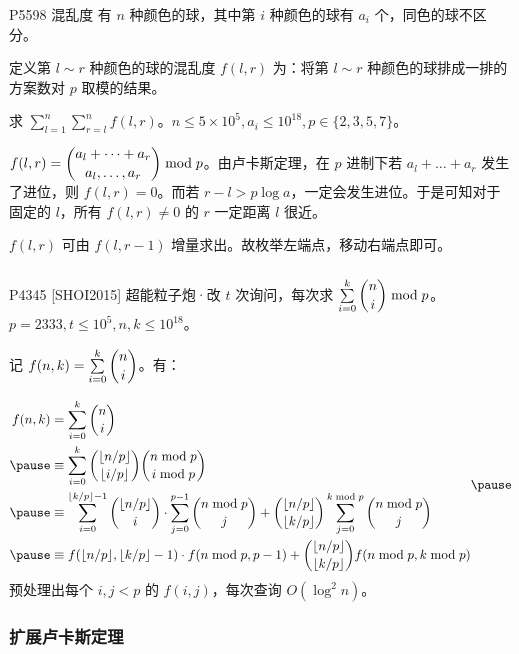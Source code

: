 \documentclass[../main.tex]{subfiles}
\begin{document}
\begin{frame}{P5598 混乱度}
有 $n$ 种颜色的球，其中第 $i$ 种颜色的球有 $a_i$ 个，同色的球不区分。

定义第 $l\sim r$ 种颜色的球的混乱度 $f(l,r)$ 为：将第 $l\sim r$ 种颜色的球排成一排的方案数对 $p$ 取模的结果。

求 $\sum\limits_{l=1}^n\sum\limits_{r=l}^nf(l,r)$。$n\le 5\times10^5,a_i\le10^{18},p\in\{2,3,5,7\}$。
\end{frame}

\begin{frame}
$f(l,r)=\dbinom{a_{l}+\dots+a_r}{a_l,\dots,a_r}\bmod p$。由卢卡斯定理，在 $p$ 进制下若 $a_l+\dots+a_r$ 发生了进位，则 $f(l,r)=0$。而若 $r-l>p\log a$，一定会发生进位。于是可知对于固定的 $l$，所有 $f(l,r)\neq 0$ 的 $r$ 一定距离 $l$ 很近。\pause
\medskip

$f(l,r)$ 可由 $f(l,r-1)$ 增量求出。故枚举左端点，移动右端点即可。
\end{frame}

\subsubsection{}

\begin{frame}{P4345 [SHOI2015] 超能粒子炮·改}
$t$ 次询问，每次求 $\sum\limits_{i=0}^k\dbinom{n}{i}\bmod p$。$p=2333,t\le 10^5,n,k\le 10^{18}$。\pause
\bigskip

记 $f(n,k)=\sum\limits_{i=0}^k\dbinom{n}{i}$。有：
\end{frame}

\begin{frame}
$$
\begin{aligned}
f(n,k)&=\sum_{i=0}^k\binom{n}{i}\\ \pause
&\equiv\sum_{i=0}^k\binom{\lfloor n/p\rfloor}{\lfloor i/p\rfloor}\binom{n\bmod p}{i\bmod p}\\ \pause
&\equiv \sum_{i=0}^{\lfloor k/p\rfloor-1}\binom{\lfloor n/p\rfloor}{i}\cdot \sum_{j=0}^{p-1}\binom{n\bmod p}{j}+\binom{\lfloor n/p\rfloor}{\lfloor k/p\rfloor}\sum_{j=0}^{k\bmod p}\binom{n\bmod p}{j}\\ \pause
&\equiv f(\lfloor n/p\rfloor, \lfloor k/p\rfloor-1)\cdot f(n\bmod p,p-1)+\binom{\lfloor n/p\rfloor}{\lfloor k/p\rfloor}f(n\bmod p,k\bmod p)
\end{aligned} \pause
$$
预处理出每个 $i,j<p$ 的 $f(i,j)$，每次查询 $O(\log^2 n)$。
\end{frame}

\subsubsection{扩展卢卡斯定理}
\end{document}
